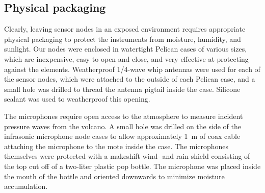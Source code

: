 \subsection{Physical packaging}

Clearly, leaving sensor nodes in an exposed environment requires
appropriate physical packaging to protect the instruments from
moisture, humidity, and sunlight. Our nodes were enclosed in watertight 
Pelican cases of various sizes, which are inexpensive, easy to open and 
close, and very effective at protecting against the elements. 
Weatherproof 1/4-wave whip antennas were used for each of the sensor 
nodes, which were attached to the outside of each Pelican case, and a
small hole was drilled to thread the antenna pigtail inside the case.
Silicone sealant was used to weatherproof this opening.

The microphones require open access to the atmosphere to
measure incident pressure waves from the volcano.  A small hole was 
drilled on the side of the infrasonic microphone node cases to allow
approximately 1~m of coax cable attaching the microphone 
to the mote inside the case. The microphones themselves were protected
with a makeshift wind- and rain-shield consisting of the top cut off
of a two-liter plastic pop bottle. The microphone was placed inside
the mouth of the bottle and oriented downwards to minimize moisture
accumulation.

